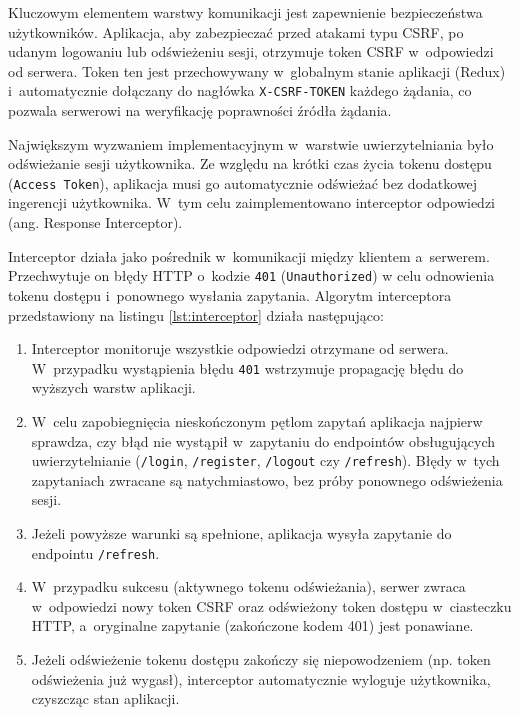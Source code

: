 Kluczowym elementem warstwy komunikacji jest zapewnienie bezpieczeństwa użytkowników. Aplikacja, aby zabezpieczać przed 
atakami typu CSRF, po udanym logowaniu lub odświeżeniu sesji, otrzymuje token CSRF w~odpowiedzi od serwera. Token ten jest 
przechowywany w~globalnym stanie aplikacji (Redux) i~automatycznie dołączany do nagłówka \texttt{X-CSRF-TOKEN} każdego żądania, co 
pozwala serwerowi na weryfikację poprawności źródła żądania. 

Największym wyzwaniem implementacyjnym w~warstwie uwierzytelniania było odświeżanie sesji użytkownika. Ze względu na krótki czas życia 
tokenu dostępu (\texttt{Access Token}), aplikacja musi go automatycznie odświeżać bez dodatkowej ingerencji użytkownika. W~tym celu zaimplementowano 
interceptor odpowiedzi (ang. Response Interceptor).

Interceptor działa jako pośrednik w~komunikacji między klientem a~serwerem. Przechwytuje on błędy HTTP o~kodzie \texttt{401} (\texttt{Unauthorized}) 
w celu odnowienia tokenu dostępu i~ponownego wysłania zapytania. Algorytm interceptora przedstawiony na listingu \ref{lst:interceptor} 
działa następująco:
\begin{enumerate}
    \item Interceptor monitoruje wszystkie odpowiedzi otrzymane od serwera. W~przypadku wystąpienia błędu \texttt{401} wstrzymuje 
    propagację błędu do wyższych warstw aplikacji.
    \item W~celu zapobiegnięcia nieskończonym pętlom zapytań aplikacja najpierw sprawdza, czy błąd nie wystąpił w~zapytaniu do endpointów 
    obsługujących uwierzytelnianie (\texttt{/login}, \texttt{/register}, \texttt{/logout} czy \texttt{/refresh}). Błędy w~tych zapytaniach 
    zwracane są natychmiastowo, bez próby ponownego odświeżenia sesji.
    \item Jeżeli powyższe warunki są spełnione, aplikacja wysyła zapytanie do endpointu \texttt{/refresh}.
    \item W~przypadku sukcesu (aktywnego tokenu odświeżania), serwer zwraca w~odpowiedzi nowy token CSRF oraz odświeżony 
    token dostępu w~ciasteczku HTTP, a~oryginalne zapytanie (zakończone kodem 401) jest ponawiane.
    \item Jeżeli odświeżenie tokenu dostępu zakończy się niepowodzeniem (np. token odświeżenia już wygasł), interceptor automatycznie 
    wyloguje użytkownika, czyszcząc stan aplikacji.
\end{enumerate}

